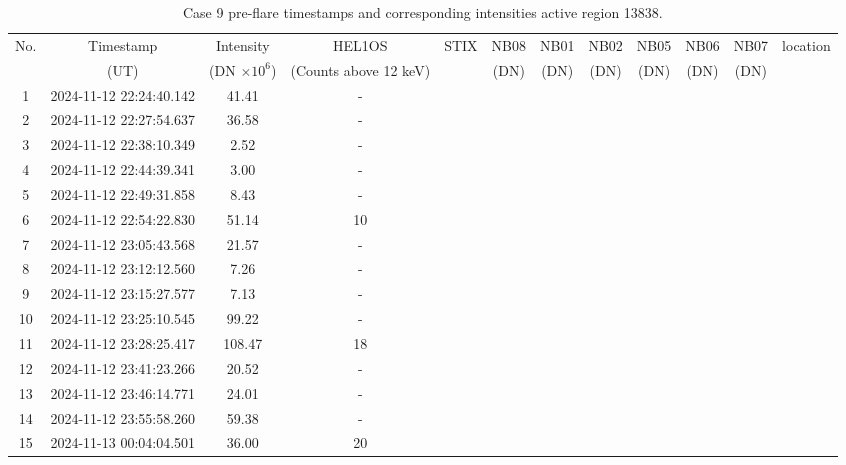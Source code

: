 \documentclass[fleqn,usenatbib]{mnras}
\begin{document}
\begin{table}
    \centering
    \caption{Case 9 pre-flare timestamps and corresponding intensities active region 13838.}
   \begin{tabular}{cccccccccccc}
        \hline
        No. & Timestamp & Intensity & HEL1OS & STIX & NB08 &NB01 & NB02 & NB05 & NB06 & NB07 & location\\
        &(UT) & (DN $\times 10^6$) & (Counts above 12 keV) & & (DN)& (DN)& (DN)& (DN)& (DN) & (DN)\\
        \hline
    1& 2024-11-12 22:24:40.142& 41.41 & -\\
	2& 2024-11-12 22:27:54.637& 36.58 & -\\
	3& 2024-11-12 22:38:10.349& 2.52 & -\\
	4& 2024-11-12 22:44:39.341& 3.00 & -\\
	5& 2024-11-12 22:49:31.858& 8.43 & -\\
	6& 2024-11-12 22:54:22.830& 51.14 & 10 \\
	7& 2024-11-12 23:05:43.568& 21.57 & -\\
	8& 2024-11-12 23:12:12.560& 7.26 & -\\
	9& 2024-11-12 23:15:27.577& 7.13 & -\\
	10& 2024-11-12 23:25:10.545& 99.22 & -\\
	11& 2024-11-12 23:28:25.417& 108.47 & 18 \\
	12& 2024-11-12 23:41:23.266& 20.52 & -\\
	13& 2024-11-12 23:46:14.771& 24.01 & -\\
	14& 2024-11-12 23:55:58.260& 59.38 & -\\
	15& 2024-11-13 00:04:04.501& 36.00 & 20 \\

        \hline
    \end{tabular}
\end{table}
\end{document}
